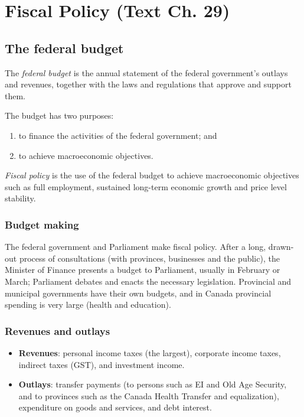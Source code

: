 \chapter{Fiscal Policy (Text Ch. 29)}

\section{The federal budget}

\begin{definition}
The \emph{federal budget} is the annual statement of the federal government's outlays
and revenues, together with the laws and regulations that approve and support them.
\end{definition}

The budget has two purposes:
\begin{enumerate}
  \item to finance the activities of the federal government; and
  \item to achieve macroeconomic objectives.
\end{enumerate}

\begin{definition}
\emph{Fiscal policy} is the use of the federal budget to achieve macroeconomic objectives
such as full employment, sustained long-term economic growth and price level stability.
\end{definition}

\subsection{Budget making}

The federal government and Parliament make fiscal policy. After a long, drawn-out
process of consultations (with provinces, businesses and the public), the Minister of
Finance presents a budget to Parliament, usually in February or March; Parliament debates
and enacts the necessary legislation. Provincial and municipal governments have their own
budgets, and in Canada provincial spending is very large (health and education).

\subsection{Revenues and outlays}

\begin{itemize}
  \item \textbf{Revenues}: personal income taxes (the largest), corporate income taxes,
        indirect taxes (GST), and investment income.
  \item \textbf{Outlays}: transfer payments (to persons such as EI and Old Age Security,
        and to provinces such as the Canada Health Transfer and equalization),
        expenditure on goods and services, and debt interest.
\end{itemize}

